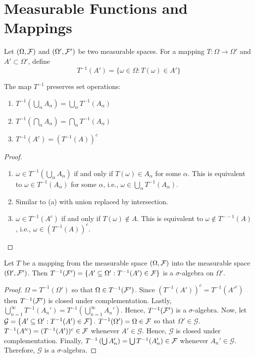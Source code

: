 \chapter{Measurable Functions and Mappings}

\begin{definition}[$\F/F'$-measurable]
Let $(\Omega, \mathcal F)$ and $(\Omega',\mathcal F')$ be two measurable spaces. For a mapping $T:\Omega\to\Omega'$ and $A'\subset \Omega'$, define
\begin{equation*}
T^{-1}(A')=\{\omega\in\Omega: T(\omega)\in A' \}
\end{equation*}
\end{definition}

\begin{theorem}
The map $T^{-1}$ preserves set operations:
\begin{enumerate}
\item $T^{-1}(\bigcup_\alpha A_\alpha)=\bigcup_\alpha T^{-1}(A_\alpha)$
\item $T^{-1}(\bigcap_\alpha A_\alpha)=\bigcap_\alpha T^{-1}(A_\alpha)$
\item $T^{-1}(A^c)=(T^{-1}(A))^c$
\end{enumerate}
\end{theorem}

\begin{proof}
\begin{enumerate}
\item $\omega \in T^{-1}\left(\bigcup_\alpha A_\alpha\right)$ if and only if $T(\omega)\in A_\alpha$ for some $\alpha$. This is equivalent to $\omega\in T^{-1}(A_\alpha)$ for some $\alpha$, i.e., $\omega\in \bigcup_\alpha T^{-1}(A_\alpha)$.
\item Similar to (a) with union replaced by intersection.
\item $\omega\in T^{-1}(A^c)$ if and only if $T(\omega)\notin A$. This is equivalent to $\omega\notin T^{--1}(A)$, i.e., $\omega\in(T^{-1}(A))^c$.
\end{enumerate}
\end{proof}

\begin{theorem}
Let $T$ be a mapping from the measurable space $(\Omega, \mathcal F)$ into the measurable space $(\Omega', \mathcal F')$. Then $T^{-1}(\mathcal F')=\{A'\subseteq\Omega':T^{-1}(A')\in\mathcal F \}$ is a $\sigma$-algebra on $\Omega'$.
\end{theorem}

\begin{proof}
$\Omega=T^{-1}(\Omega')$  so that $\Omega\in T^{-1}(\mathcal F')$. Since $(T^{-1}(A'))^c=T^{-1}(A'^c)$ then $T^{-1}(\mathcal F')$ is closed under complementation. Lastly, $\bigcup_{n=1}^\infty T^{-1}(A_n')=T^{-1}\left(\bigcup_{n=1}^\infty A_n'\right)$. Hence, $T^{-1}(\mathcal F')$ is a $\sigma$-algebra. Now, let $\mathcal{G}=\{A'\subseteq\Omega':T^{-1}(A')\in\mathcal F \}$. $T^{-1}(\Omega')=\Omega\in\mathcal F$ so that $\Omega'\in\mathcal{G}$. $T^{-1}(A'^c)=(T^{-1}(A'))^c\in\mathcal F$ whenever $A'\in\mathcal{G}$. Hence, $\mathcal{G}$ is closed under complementation. Finally, $T^{-1}\left(\bigcup A_n'\right)=\bigcup T^{-1}(A_n')\in\mathcal F$ whenever $A_n'\in\mathcal{G}$. Therefore, $\mathcal{G}$ is a $\sigma$-algebra.
\end{proof}

